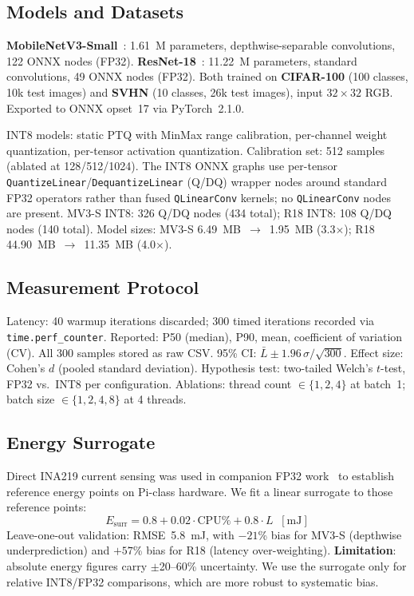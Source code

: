 \documentclass[journal]{IEEEtran}
\begin{document}
\subsection{Models and Datasets}
\textbf{MobileNetV3-Small}~\cite{howard2019searching}: 1.61~M parameters, depthwise-separable convolutions, 122 ONNX nodes (FP32). \textbf{ResNet-18}~\cite{he2016deep}: 11.22~M parameters, standard convolutions, 49 ONNX nodes (FP32). Both trained on \textbf{CIFAR-100} (100 classes, 10k test images) and \textbf{SVHN} (10 classes, 26k test images), input $32\times32$ RGB. Exported to ONNX opset~17 via PyTorch~2.1.0.

INT8 models: static PTQ with MinMax range calibration, per-channel weight quantization, per-tensor activation quantization. Calibration set: 512 samples (ablated at 128/512/1024). The INT8 ONNX graphs use per-tensor \texttt{QuantizeLinear}/\texttt{DequantizeLinear} (Q/DQ) wrapper nodes around standard FP32 operators rather than fused \texttt{QLinearConv} kernels; no \texttt{QLinearConv} nodes are present. MV3-S INT8: 326 Q/DQ nodes (434 total); R18 INT8: 108 Q/DQ nodes (140 total). Model sizes: MV3-S 6.49~MB~$\to$~1.95~MB (3.3$\times$); R18 44.90~MB~$\to$~11.35~MB (4.0$\times$).

\subsection{Measurement Protocol}
Latency: 40 warmup iterations discarded; 300 timed iterations recorded via \texttt{time.perf\_counter}. Reported: P50 (median), P90, mean, coefficient of variation (CV). All 300 samples stored as raw CSV. 95\% CI: $\bar{L} \pm 1.96\,\sigma/\!\sqrt{300}$. Effect size: Cohen's $d$ (pooled standard deviation). Hypothesis test: two-tailed Welch's $t$-test, FP32 vs.\ INT8 per configuration. Ablations: thread count $\in\{1,2,4\}$ at batch~1; batch size $\in\{1,2,4,8\}$ at 4 threads.

\subsection{Energy Surrogate}
Direct INA219 current sensing was used in companion FP32 work~\cite{bacciu2021experimental} to establish reference energy points on Pi-class hardware. We fit a linear surrogate to those reference points:
\begin{equation}
  E_{\text{surr}} = 0.8 + 0.02 \cdot \text{CPU\%} + 0.8 \cdot L \;\; [\text{mJ}]
  \label{eq:surr}
\end{equation}
Leave-one-out validation: RMSE~5.8~mJ, with $-21$\% bias for MV3-S (depthwise underprediction) and $+57$\% bias for R18 (latency over-weighting). \textbf{Limitation}: absolute energy figures carry $\pm$20--60\% uncertainty. We use the surrogate only for relative INT8/FP32 comparisons, which are more robust to systematic bias.
\end{document}
